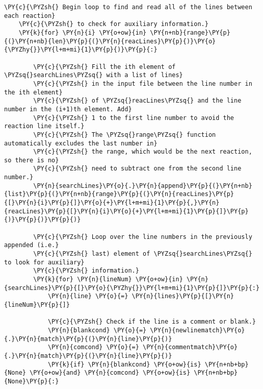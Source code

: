 \begin{Verbatim}[commandchars=\\\{\}]
    \PY{c}{\PYZsh{} Begin loop to find and read all of the lines between each reaction}
    \PY{c}{\PYZsh{} to check for auxiliary information.}
    \PY{k}{for} \PY{n}{i} \PY{o+ow}{in} \PY{n+nb}{range}\PY{p}{(}\PY{n+nb}{len}\PY{p}{(}\PY{n}{reacLines}\PY{p}{)}\PY{o}{\PYZhy{}}\PY{l+m+mi}{1}\PY{p}{)}\PY{p}{:}

        \PY{c}{\PYZsh{} Fill the ith element of \PYZsq{}searchLines\PYZsq{} with a list of lines}
        \PY{c}{\PYZsh{} in the input file between the line number in the ith element}
        \PY{c}{\PYZsh{} of \PYZsq{}reacLines\PYZsq{} and the line number in the (i+1)th element. Add}
        \PY{c}{\PYZsh{} 1 to the first line number to avoid the reaction line itself.}
        \PY{c}{\PYZsh{} The \PYZsq{}range\PYZsq{} function automatically excludes the last number in}
        \PY{c}{\PYZsh{} the range, which would be the next reaction, so there is no}
        \PY{c}{\PYZsh{} need to subtract one from the second line number.}
        \PY{n}{searchLines}\PY{o}{.}\PY{n}{append}\PY{p}{(}\PY{n+nb}{list}\PY{p}{(}\PY{n+nb}{range}\PY{p}{(}\PY{n}{reacLines}\PY{p}{[}\PY{n}{i}\PY{p}{]}\PY{o}{+}\PY{l+m+mi}{1}\PY{p}{,}\PY{n}{reacLines}\PY{p}{[}\PY{n}{i}\PY{o}{+}\PY{l+m+mi}{1}\PY{p}{]}\PY{p}{)}\PY{p}{)}\PY{p}{)}

        \PY{c}{\PYZsh{} Loop over the line numbers in the previously appended (i.e.}
        \PY{c}{\PYZsh{} last) element of \PYZsq{}searchLines\PYZsq{} to look for auxiliary}
        \PY{c}{\PYZsh{} information.}
        \PY{k}{for} \PY{n}{lineNum} \PY{o+ow}{in} \PY{n}{searchLines}\PY{p}{[}\PY{o}{\PYZhy{}}\PY{l+m+mi}{1}\PY{p}{]}\PY{p}{:}
            \PY{n}{line} \PY{o}{=} \PY{n}{lines}\PY{p}{[}\PY{n}{lineNum}\PY{p}{]}

            \PY{c}{\PYZsh{} Check if the line is a comment or blank.}
            \PY{n}{blankcond} \PY{o}{=} \PY{n}{newlinematch}\PY{o}{.}\PY{n}{match}\PY{p}{(}\PY{n}{line}\PY{p}{)}
            \PY{n}{comcond} \PY{o}{=} \PY{n}{commentmatch}\PY{o}{.}\PY{n}{match}\PY{p}{(}\PY{n}{line}\PY{p}{)}
            \PY{k}{if} \PY{n}{blankcond} \PY{o+ow}{is} \PY{n+nb+bp}{None} \PY{o+ow}{and} \PY{n}{comcond} \PY{o+ow}{is} \PY{n+nb+bp}{None}\PY{p}{:}


\end{Verbatim}
